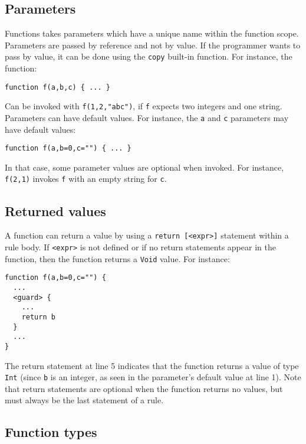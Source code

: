 \documentclass[11pt]{report}
\begin{document}
\subsection{Parameters}

Functions takes parameters which have a unique name within the function scope. Parameters are passed by reference and not by value. If the programmer wants to pass by value, it can be done using the \texttt{copy} built-in function. For instance, the function:

\begin{verbatim}
function f(a,b,c) { ... }
\end{verbatim}

Can be invoked with \texttt{f(1,2,"abc")}, if \texttt{f} expects two integers and one string. Parameters can have default values. For instance, the \texttt{a} and \texttt{c} parameters may have default values:

\begin{verbatim}
function f(a,b=0,c="") { ... }
\end{verbatim}

In that case, some parameter values are optional when invoked. For instance, \texttt{f(2,1)} invokes \texttt{f} with an empty string for \texttt{c}.

\subsection{Returned values}

A function can return a value by using a \texttt{return [<expr>]} statement within a rule body. If \texttt{<expr>} is not defined or if no return statements appear in the function, then the function returns a \texttt{Void} value. For instance:

\begin{lstlisting}
function f(a,b=0,c="") {
  ...
  <guard> {
    ...
    return b
  }
  ...
}
\end{lstlisting}

The return statement at line 5 indicates that the function returns a value of type \texttt{Int} (since \texttt{b} is an integer, as seen in the parameter's default value at line 1). Note that return statements are optional when the function returns no values, but must always be the last statement of a rule.

\subsection{Function types}
\end{document}
